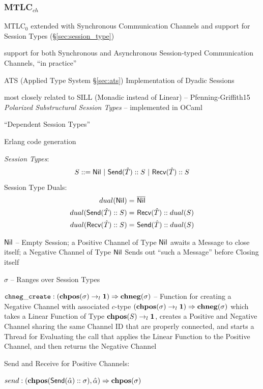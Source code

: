 \subsubsection{MTLC$_{ch}$}\label{sec:mtlc_ch}

MTLC$_0$ extended with Synchronous Communication Channels and support
for Session Types (\S\ref{sec:session_type})

support for both Synchronous and Asynchronous Session-typed
Communication Channels, ``in practice'' %

ATS (Applied Type System \S\ref{sec:ats}) Implementation of Dyadic
Sessions

most closely related to SILL (Monadic instead of Linear) --
Pfenning-Griffith15 \emph{Polarized Substructural Session Types} --
implemented in OCaml %

``Dependent Session Types''

Erlang code generation

\emph{Session Types}:
\[
  S ::= \Nil \ |\ \Send(\hat{T}) :: S \ |\ \Recv(\hat{T}) :: S
\]
Session Type Duals:
\begin{align*}
  dual(\mathsf{Nil})              =&\ \overline{\mathsf{Nil}} \\
  dual(\mathsf{Send}(\hat{T})::S) =&\ \mathsf{Recv}(\hat{T}) :: dual(S) \\
  dual(\mathsf{Recv}(\hat{T})::S) =&\ \mathsf{Send}(\hat{T}) :: dual(S)
\end{align*}

$\mathsf{Nil}$ -- Empty Session; a Positive Channel of Type $\mathsf{Nil}$ awaits a
Message to close itself; a Negative Channel of Type $\mathsf{Nil}$ Sends out
``such a Message'' before Closing itself %

$\sigma$ -- Ranges over Session Types

$\mathtt{chneg\_create} : (\mathbf{chpos}(\sigma) \rightarrow_l \mathbf{1})
\Rightarrow \mathbf{chneg}(\sigma)$ -- Function for creating a Negative
Channel with associated $c$-type $(\mathbf{chpos}(\sigma) \rightarrow_l
\mathbf{1}) \Rightarrow \mathbf{chneg}(\sigma)$ which takes a Linear Function
of Type $\mathbf{chpos}(S) \rightarrow_l \mathbf{1}$, creates a Positive and
Negative Channel sharing the same Channel ID that are properly
connected, and starts a Thread for Evaluating the call that applies
the Linear Function to the Positive Channel, and then returns the
Negative Channel

Send and Receive for Positive Channels:

$send : (\mathbf{chpos} (\mathsf{Send}(\hat{\alpha}) :: \sigma), \hat{\alpha})
\Rightarrow \mathbf{chpos}(\sigma)$

